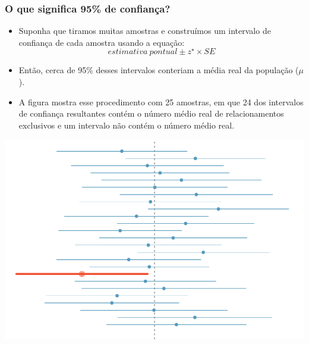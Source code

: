 \begin{frame}
\frametitle{O que significa 95\% de confiança?}

\begin{itemize}
\justifying
\item Suponha que tiramos muitas amostras e construímos um intervalo de confiança de cada amostra usando a equação: \\ {\[ estimativa ~ pontual \pm z^\star \times SE \] }
\justifying
\item Então, cerca de 95\% desses intervalos conteriam a média real da população ($\mu$). 

\end{itemize}

{
\begin{itemize}
\justifying
\footnotesize
\item A figura mostra esse procedimento com 25 amostras, em que 24 dos intervalos de confiança resultantes contém o número médio real de relacionamentos exclusivos e um intervalo não contém o número médio real.

\end{itemize}
}
{
\includegraphics[width=\textwidth]{4-2_conf_int/95PercentConfidenceInterval.pdf}
}

\end{frame}


